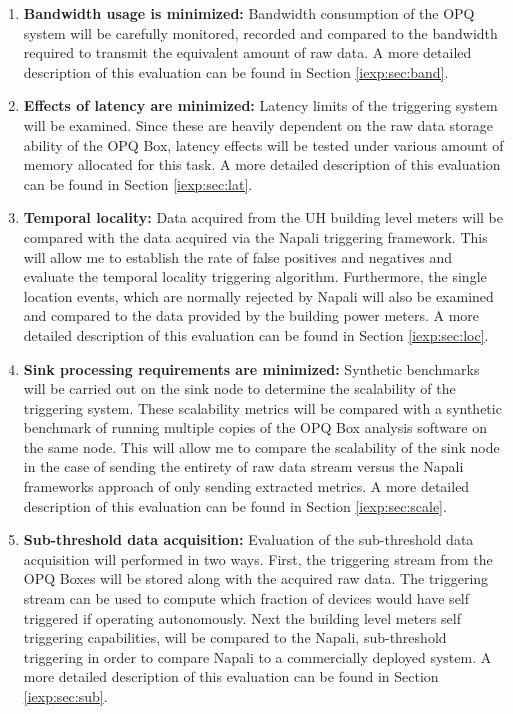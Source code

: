 \begin{enumerate}
  \item \textbf{Bandwidth usage is minimized:} Bandwidth consumption of the OPQ system will be carefully monitored, recorded and compared to the bandwidth required to transmit the equivalent amount of raw data. A more detailed description of this evaluation can be found in Section \ref{iexp:sec:band}.
    
	\item \textbf{Effects of latency are minimized:}  Latency limits of the triggering system will be examined. Since these are heavily dependent on the raw data storage ability of the OPQ Box, latency effects will be tested under various amount of memory allocated for this task. A more detailed description of this evaluation can be found in Section \ref{iexp:sec:lat}.
  
  \item \textbf{Temporal locality:} Data acquired from the UH building level meters will be compared with the data acquired via the Napali triggering framework.  This will allow me to establish the rate of false positives and negatives and evaluate the temporal locality triggering algorithm. Furthermore, the single location events, which are normally rejected by Napali will also be examined and compared to the data provided by the building power meters. A more detailed description of this evaluation can be found in Section \ref{iexp:sec:loc}.

  \item \textbf{Sink processing requirements are minimized:} Synthetic benchmarks will be carried out on the sink node to determine the scalability of the triggering system. These scalability metrics will be compared with a synthetic benchmark of running multiple copies of the OPQ Box analysis software on the same node. This will allow me to compare the scalability of the sink node in the case of sending the entirety of raw data stream versus the Napali frameworks approach of only sending extracted metrics. A more detailed description of this evaluation can be found in Section \ref{iexp:sec:scale}.

	\item \textbf{Sub-threshold data acquisition:} Evaluation of the sub-threshold data acquisition will performed in two ways. First, the triggering stream from the OPQ Boxes will be stored along with the acquired raw data. The triggering stream can be used to compute which fraction of devices would have self triggered if operating autonomously. Next the building level meters self triggering capabilities, will be compared to the Napali, sub-threshold triggering in order to compare Napali to a commercially deployed system. A more detailed description of this evaluation can be found in Section \ref{iexp:sec:sub}.
  
\end{enumerate}
